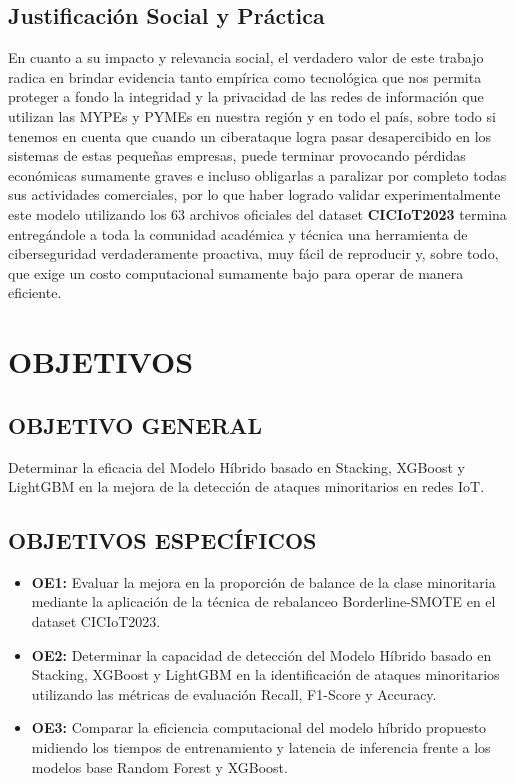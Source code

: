 \subsection{Justificación Social y Práctica}
En cuanto a su impacto y relevancia social, el verdadero valor de este trabajo radica en brindar evidencia tanto empírica como tecnológica que nos permita proteger a fondo la integridad y la privacidad de las redes de información que utilizan las MYPEs y PYMEs en nuestra región y en todo el país, sobre todo si tenemos en cuenta que cuando un ciberataque logra pasar desapercibido en los sistemas de estas pequeñas empresas, puede terminar provocando pérdidas económicas sumamente graves e incluso obligarlas a paralizar por completo todas sus actividades comerciales, por lo que haber logrado validar experimentalmente este modelo utilizando los 63 archivos oficiales del dataset \textbf{CICIoT2023} termina entregándole a toda la comunidad académica y técnica una herramienta de ciberseguridad verdaderamente proactiva, muy fácil de reproducir y, sobre todo, que exige un costo computacional sumamente bajo para operar de manera eficiente.

\section{OBJETIVOS}

\subsection{OBJETIVO GENERAL}
Determinar la eficacia del Modelo Híbrido basado en Stacking, XGBoost y LightGBM en la mejora de la detección de ataques minoritarios en redes IoT.

\subsection{OBJETIVOS ESPECÍFICOS}
\begin{itemize}
\item \textbf{OE1:} Evaluar la mejora en la proporción de balance de la clase minoritaria mediante la aplicación de la técnica de rebalanceo Borderline-SMOTE en el dataset CICIoT2023.
\item \textbf{OE2:} Determinar la capacidad de detección del Modelo Híbrido basado en Stacking, XGBoost y LightGBM en la identificación de ataques minoritarios utilizando las métricas de evaluación Recall, F1-Score y Accuracy.
\item \textbf{OE3:} Comparar la eficiencia computacional del modelo híbrido propuesto midiendo los tiempos de entrenamiento y latencia de inferencia frente a los modelos base Random Forest y XGBoost.
\end{itemize}

